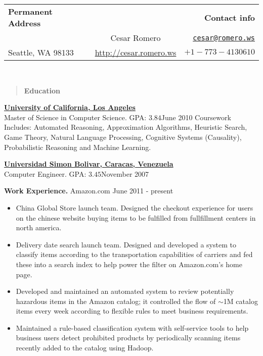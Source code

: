 \documentclass[10pt]{article}
\newcommand{\vitem}{\vspace*{-.4pc}\item}
\begin{document}
\begin{tabular}{lcr}
  \textbf{Permanent Address}&&\textbf{Contact info}\\
  \href{}{}&\hspace*{2cm}\huge{Cesar Romero}\hspace*{2cm}&\href{mailto:cesar@romero.ws}{\texttt{cesar@romero.ws}}\\
Seattle, WA
98133&\href{http://cesar.romero.ws}{http://cesar.romero.ws}&$+1-773-4130610$\\
\end{tabular}\\
\underline{\makebox[\textwidth]{\hfill}}
\begin{quote}
  \centering{}
 \textbf{Education}
\end{quote}
\href{http://www.ucla.edu}{\textbf{University of California, Los Angeles}}\\
Master of Science in Computer Science. GPA: $3.84$\hfill June 2010
Coursework Includes: Automated Reasoning, Approximation Algorithms,
Heuristic Search, Game Theory, Natural Language Processing, Cognitive
Systems (Causality), Probabilistic Reasoning and Machine Learning.

\noindent\href{http://www.usb.ve}{\textbf{Universidad Simon Bolivar, Caracas, Venezuela}}\\
Computer Engineer. GPA: $3.45$\hfill November 2007

\centering{}\textbf{Work Experience.}
 Amazon.com \hfill June 2011 - present
\begin{itemize}
  \vitem China Global Store launch team. Designed the checkout
  experience for users on the chinese website buying items to be
  fulfilled from fullfillment centers in north america.
  \vitem Delivery date search launch team. Designed and developed a
  system to classify items according to the transportation
  capabilities of carriers and fed these into a search index to help
  power the filter on Amazon.com's home page.
  \vitem Developed and maintained an automated system to review
  potentially hazardous items in the Amazon catalog; it controlled the
  flow of $\sim$1M catalog items every week according to flexible rules to
  meet business requirements.
  \vitem Maintained a rule-based classification system with
  self-service tools to help business users detect prohibited products
  by periodically scanning items recently added to the catalog using Hadoop.
\end{itemize}
\end{document}
